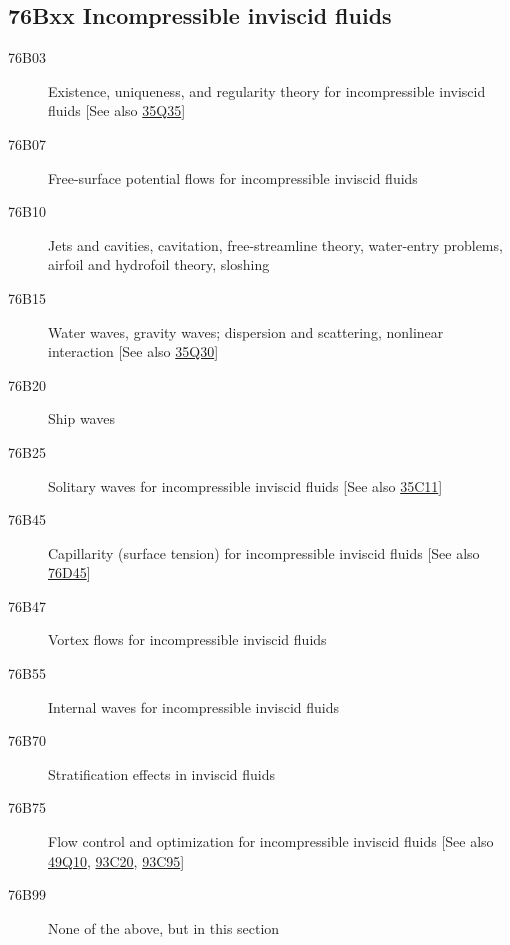 \documentclass[letterpaper]{article}
\begin{document}
\subsection*{76Bxx  Incompressible inviscid fluids }\label{76Bxx}
\begin{description}  
\item [76B03]\label{76B03} Existence, uniqueness, and regularity theory for incompressible inviscid fluids [See also \hyperref[35Q35]{35Q35}]
\item [76B07]\label{76B07} Free-surface potential flows for incompressible inviscid fluids
\item [76B10]\label{76B10} Jets and cavities, cavitation, free-streamline theory, water-entry problems, airfoil and hydrofoil theory, sloshing 
\item [76B15]\label{76B15} Water waves, gravity waves; dispersion and scattering, nonlinear interaction [See also \hyperref[35Q30]{35Q30}]
\item [76B20]\label{76B20} Ship waves
\item [76B25]\label{76B25} Solitary waves for incompressible inviscid fluids [See also \hyperref[35C11]{35C11}]
\item [76B45]\label{76B45} Capillarity (surface tension) for incompressible inviscid fluids [See also \hyperref[76D45]{76D45}]
\item [76B47]\label{76B47} Vortex flows for incompressible inviscid fluids
\item [76B55]\label{76B55} Internal waves for incompressible inviscid fluids
\item [76B70]\label{76B70} Stratification effects in inviscid fluids
\item [76B75]\label{76B75} Flow control and optimization for incompressible inviscid fluids [See also \hyperref[49Q10]{49Q10}, \hyperref[93C20]{93C20}, \hyperref[93C95]{93C95}]
\item [76B99]\label{76B99} None of the above, but in this section
\end{description}
\end{document}
